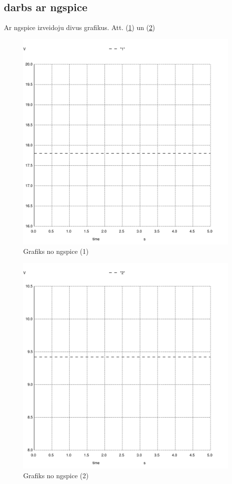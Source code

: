 \documentclass{report}
\begin{document}
\subsection{darbs ar ngspice}
Ar ngspice izveidoju divus grafikus. Att. (\ref{ngspice grafiks 1}) un (\ref{ngspice grafiks 2})
\begin{figure}[!tb]
\includegraphics[width=\textwidth,height=\textheight,keepaspectratio]{IMAGES/011.png}
\caption{Grafiks no ngspice (1)}
\label{ngspice grafiks 1}
\end{figure}
\begin{figure}[!tb]
\includegraphics[width=\textwidth,height=\textheight,keepaspectratio]{IMAGES/012.png}
\caption{Grafiks no ngspice (2)}
\label{ngspice grafiks 2}
\end{figure}
\end{document}
